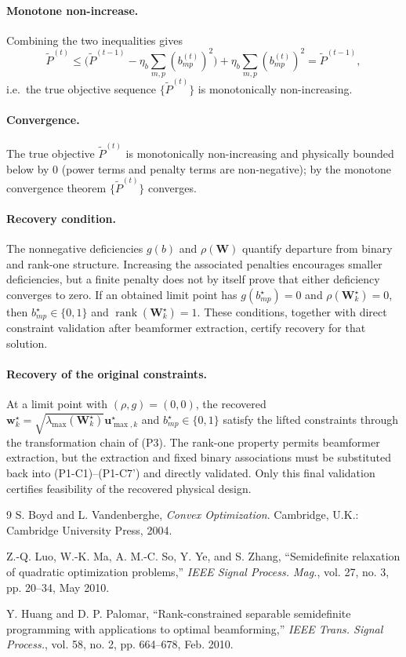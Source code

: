 \documentclass[12pt,a4paper]{article}
\newcommand{\vect}[1]{\mathbf{#1}}
\newcommand{\mat}[1]{\mathbf{#1}}
\DeclareMathOperator{\rank}{rank}
\begin{document}
\paragraph{Monotone non-increase.} Combining the two inequalities gives
\[
\tilde{P}^{(t)} \leq \big(\tilde{P}^{(t-1)} - \eta_b \sum_{m,p} (b_{mp}^{(t)})^2\big) + \eta_b \sum_{m,p} (b_{mp}^{(t)})^2 = \tilde{P}^{(t-1)},
\]
i.e.\ the true objective sequence $\{\tilde{P}^{(t)}\}$ is monotonically non-increasing.

\paragraph{Convergence.} The true objective $\tilde{P}^{(t)}$ is monotonically non-increasing and physically bounded below by $0$ (power terms and penalty terms are non-negative); by the monotone convergence theorem $\{\tilde{P}^{(t)}\}$ converges.

\paragraph{Recovery condition.} The nonnegative deficiencies $g(b)$ and $\rho(\mat{W})$ quantify departure from binary and rank-one structure. Increasing the associated penalties encourages smaller deficiencies, but a finite penalty does not by itself prove that either deficiency converges to zero. If an obtained limit point has $g(b_{mp}^\star)=0$ and $\rho(\mat{W}_k^\star)=0$, then $b_{mp}^\star\in\{0,1\}$ and $\rank(\mat{W}_k^\star)=1$. These conditions, together with direct constraint validation after beamformer extraction, certify recovery for that solution.

\paragraph{Recovery of the original constraints.} At a limit point with $(\rho,g)=(0,0)$, the recovered $\vect{w}_k^\star=\sqrt{\lambda_{\max}(\mat{W}_k^\star)}\vect{u}_{\max,k}^\star$ and $b_{mp}^\star\in\{0,1\}$ satisfy the lifted constraints through the transformation chain of (P3). The rank-one property permits beamformer extraction, but the extraction and fixed binary associations must be substituted back into (P1-C1)--(P1-C7') and directly validated. Only this final validation certifies feasibility of the recovered physical design.

\begin{thebibliography}{9}
S. Boyd and L. Vandenberghe, \emph{Convex Optimization}. Cambridge, U.K.: Cambridge University Press, 2004.

Z.-Q. Luo, W.-K. Ma, A. M.-C. So, Y. Ye, and S. Zhang, ``Semidefinite relaxation of quadratic optimization problems,'' \emph{IEEE Signal Process. Mag.}, vol. 27, no. 3, pp. 20--34, May 2010.

Y. Huang and D. P. Palomar, ``Rank-constrained separable semidefinite programming with applications to optimal beamforming,'' \emph{IEEE Trans. Signal Process.}, vol. 58, no. 2, pp. 664--678, Feb. 2010.
\end{thebibliography}
\end{document}
